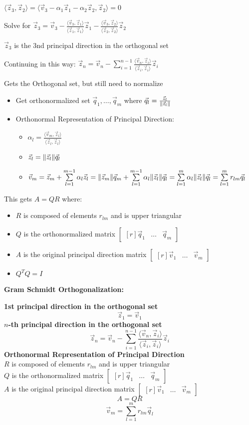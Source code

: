 \documentclass{article}\usepackage{amsmath,amssymb,amsthm,tikz,tkz-graph,color,chngpage,soul,hyperref,csquotes,graphicx,floatrow,framed,scrextend,mathtools,mathrsfs}\newcommand*{\QEDB}{\hfill\ensuremath{\square}}\newtheorem*{prop}{Proposition}\renewcommand{\theenumi}{\alph{enumi}}\usepackage[shortlabels]{enumitem}\usepackage[nobreak=true]{mdframed}\usetikzlibrary{matrix,calc}\MakeOuterQuote{"}\usepackage[margin=0.75in]{geometry} \newtheorem{theorem}{Theorem}\newcommand{\Z}{\mathbb Z}\newcommand{\R}{\mathbb R}\newcommand{\Q}{\mathbb Q}\newcommand{\N}{\mathbb N}\newcommand{\x}[1]{\textrm{#1}}\newcommand{\xs}[1]{\textrm{ #1 }}\newcommand{\pr}{\textrm{Pr}}
\newcommand{\sumlim}[3]{\sum\limits_{#1}^{#2}#3}
\newcommand{\eq}[1]{\begin{equation}#1\end{equation}}
\newcommand{\eqs}[1]{\begin{mdframed}#1\end{mdframed}}
\newcommand{\inprod}[2]{\langle #1, #2\rangle}
\DeclarePairedDelimiter{\norm}{\lVert}{\rVert}
\newcommand{\items}[1]{\begin{itemize}#1\end{itemize}}
\newcommand{\bmat}[1]{\begin{bmatrix*}[r]#1\end{bmatrix*}}
\begin{document}
{{{            \item $\inprod{\vec{z}_3}{\vec{z}_2}=\inprod{\vec{v}_3-\alpha_1\vec{z}_1-\alpha_2\vec{z}_2}{\vec{z}_2}=0$
            \item Solve for $\vec{z}_3=\vec{v}_3-\frac{\inprod{\vec{v}_3}{\vec{z}_1}}{\inprod{\vec{z}_1}{\vec{z}_1}}\vec{z}_1-\frac{\inprod{\vec{v}_3}{\vec{z}_2}}{\inprod{\vec{z}_2}{\vec{z}_2}}\vec{z}_2$
            \item $\vec{z}_3$ is the 3nd principal direction in the orthogonal set 
        }
        \item Continuing in this way: $\vec{z}_n=\vec{v}_n-\sumlim{i=1}{n-1}{\frac{\inprod{\vec{v}_n}{\vec{z}_i}}{\inprod{\vec{z}_i}{\vec{z}_i}}\vec{z}_i}$
        \item Gets the Orthogonal set, but still need to normalize
        \items{
            \item Get orthonormalized set $\vec{q}_1,\ldots,\vec{q}_m$ where $\vec{q}_l=\frac{\vec{z}_l}{\norm{\vec{z}_l}}$
            \item Orthonormal Representation of Principal Direction: 
            \items{
                \item $\alpha_l=\frac{\inprod{\vec{v}_m}{\vec{z}_l}}{\inprod{\vec{z}_l}{\vec{z}_l}}$
                \item $\vec{z}_l=\norm{\vec{z}_l}\vec{q}_l$
                \item $\vec{v}_m=\vec{z}_m+\sumlim{l=1}{m-1}{\alpha_l\vec{z}_l}=\norm{\vec{z}_m}\vec{q}_m+\sumlim{l=1}{m-1}{\alpha_l\norm{\vec{z}_l}\vec{q}_l}=\sumlim{l=1}{m}{\alpha_l\norm{\vec{z}_l}\vec{q}_l}=\sumlim{l=1}{m}{r_{lm}\vec{q}_l}$
            }
        }
        \item This gets $A=QR$ where:
        \items{
            \item $R$ is composed of elements $r_{lm}$ and is upper triangular
            \item $Q$ is the orthonormalized matrix $\bmat{\vec{q}_1&\ldots&\vec{q}_m}$
            \item $A$ is the original principal direction matrix $\bmat{\vec{v}_1&\ldots&\vec{v}_m}$
            \item $Q^TQ=I$
        }
    }
}
\textbf{Gram Schmidt Orthogonalization:}
\eqs{
\textbf{1st principal direction in the orthogonal set}
\eq{\vec{z}_1=\vec{v}_1}
\textbf{$n$-th principal direction in the orthogonal set}
\eq{\vec{z}_n=\vec{v}_n-\sumlim{i=1}{n-1}{\frac{\inprod{\vec{v}_n}{\vec{z}_i}}{\inprod{\vec{z}_i}{\vec{z}_i}}\vec{z}_i}}
\textbf{Orthonormal Representation of Principal Direction}\\
$R$ is composed of elements $r_{lm}$ and is upper triangular\\
$Q$ is the orthonormalized matrix $\bmat{\vec{q}_1&\ldots&\vec{q}_m}$\\
$A$ is the original principal direction matrix $\bmat{\vec{v}_1&\ldots&\vec{v}_m}$
\eq{A=QR}
\eq{\vec{v}_m=\sumlim{l=1}{m}{r_{lm}\vec{q}_l}}
}
\end{document}
